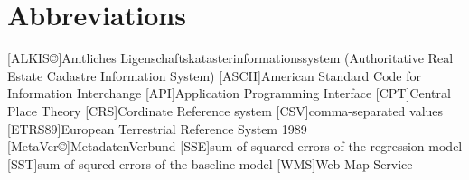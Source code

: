 \documentclass[a4paper, 11pt, oneside]{Thesis}  %
\begin{document}

\clearpage  %





\pagestyle{fancy}  %


\tableofcontents  %

\listoffigures  %


\clearpage  %
\chapter{Abbreviations}


\begin{acronym}
[ALKIS\copyright]{Amtliches Ligenschaftskatasterinformationssystem (Authoritative Real Estate Cadastre Information System)}
[ASCII]{American Standard Code for Information Interchange}
[API]{Application Programming Interface}
[CPT]{Central Place Theory}
[CRS]{Cordinate Reference system}
[CSV]{comma-separated values}
[ETRS89]{European Terrestrial Reference System 1989}
[MetaVer\copyright]{MetadatenVerbund}
[SSE]{sum of squared errors of the regression model}
[SST]{sum of squred errors of the baseline model}
[WMS]{Web Map Service}

\end{acronym}
\end{document}
